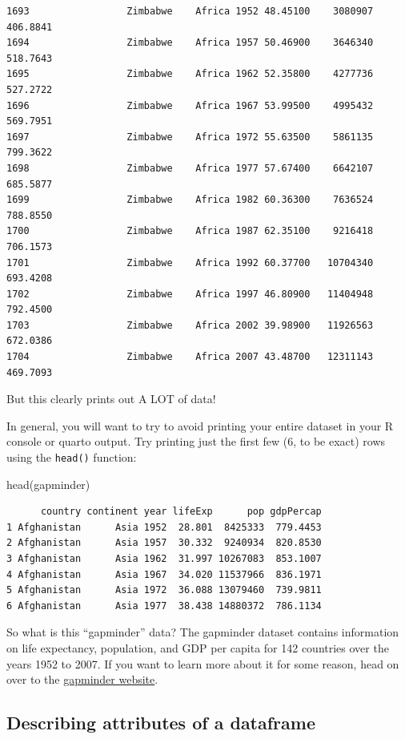 \documentclass[
  letterpaper,
  DIV=11,
  numbers=noendperiod]{scrreprt}
\newenvironment{Shaded}{\begin{snugshade}}{\end{snugshade}}
\newcommand{\FunctionTok}[1]{\textcolor[rgb]{0.28,0.35,0.67}{#1}}
\newcommand{\NormalTok}[1]{\textcolor[rgb]{0.00,0.23,0.31}{#1}}
\begin{document}
\begin{verbatim}
1693                 Zimbabwe    Africa 1952 48.45100    3080907    406.8841
1694                 Zimbabwe    Africa 1957 50.46900    3646340    518.7643
1695                 Zimbabwe    Africa 1962 52.35800    4277736    527.2722
1696                 Zimbabwe    Africa 1967 53.99500    4995432    569.7951
1697                 Zimbabwe    Africa 1972 55.63500    5861135    799.3622
1698                 Zimbabwe    Africa 1977 57.67400    6642107    685.5877
1699                 Zimbabwe    Africa 1982 60.36300    7636524    788.8550
1700                 Zimbabwe    Africa 1987 62.35100    9216418    706.1573
1701                 Zimbabwe    Africa 1992 60.37700   10704340    693.4208
1702                 Zimbabwe    Africa 1997 46.80900   11404948    792.4500
1703                 Zimbabwe    Africa 2002 39.98900   11926563    672.0386
1704                 Zimbabwe    Africa 2007 43.48700   12311143    469.7093
\end{verbatim}

But this clearly prints out A LOT of data!

In general, you will want to try to avoid printing your entire dataset
in your R console or quarto output. Try printing just the first few (6,
to be exact) rows using the \texttt{head()} function:

\begin{Shaded}
\begin{Highlighting}[]
\FunctionTok{head}\NormalTok{(gapminder)}
\end{Highlighting}
\end{Shaded}

\begin{verbatim}
      country continent year lifeExp      pop gdpPercap
1 Afghanistan      Asia 1952  28.801  8425333  779.4453
2 Afghanistan      Asia 1957  30.332  9240934  820.8530
3 Afghanistan      Asia 1962  31.997 10267083  853.1007
4 Afghanistan      Asia 1967  34.020 11537966  836.1971
5 Afghanistan      Asia 1972  36.088 13079460  739.9811
6 Afghanistan      Asia 1977  38.438 14880372  786.1134
\end{verbatim}

So what is this ``gapminder'' data? The gapminder dataset contains
information on life expectancy, population, and GDP per capita for 142
countries over the years 1952 to 2007. If you want to learn more about
it for some reason, head on over to the
\href{https://www.gapminder.org/}{gapminder website}.

\subsection{Describing attributes of a
dataframe}\label{describing-attributes-of-a-dataframe}
\end{document}
